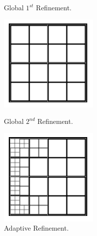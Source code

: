\begin{figure}[tbp]
  \caption{Global $1^{st}$ Refinement.}
\endminipage\hfill
{}
  \includegraphics[width=\linewidth]{figures/grid_second_refinement.png}
  \caption{Global $2^{nd}$ Refinement.}
\endminipage\hfill
{}
  \includegraphics[width=\linewidth]{figures/grid_adaptive_refinement.png}
  \caption{Adaptive Refinement.}
  \label{fig:grid_adaptive_refinement}
\endminipage\hfill
\end{figure}


